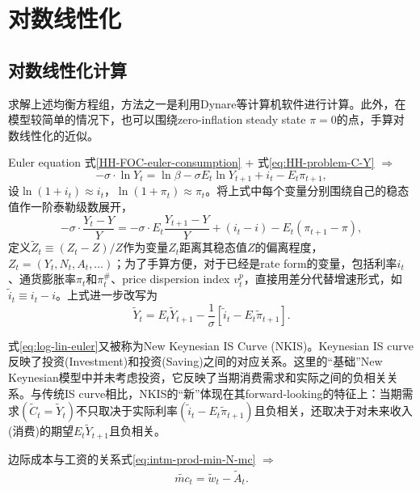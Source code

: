 \section{对数线性化}
\label{sec:BNK-log-lin-system}
\subsection{对数线性化计算}
\label{sec:BNK-log-linearization}
求解上述均衡方程组，方法之一是利用Dynare等计算机软件进行计算。此外，在模型较简单的情况下，也可以围绕zero-inflation steady state $\pi=0$的点，手算对数线性化的近似。

Euler equation 式\eqref{HH-FOC-euler-consumption} + 式\eqref{eq:HH-problem-C-Y} $\Rightarrow$
\begin{equation*}
  -\sigma \cdot \ln Y_t = \ln \beta - \sigma E_t \ln Y_{t+1} + i_t - E_t \pi_{t+1},
\end{equation*}
设$\ln (1+i_t) \approx i_t$，$\ln (1+\pi_t) \approx \pi_t$。将上式中每个变量分别围绕自己的稳态值作一阶泰勒级数展开，
\begin{equation*}
  -\sigma \cdot \frac{Y_t - Y}{Y} = -\sigma \cdot E_t \frac{Y_{t+1} - Y}{Y} + (i_t - i) - E_t (\pi_{t+1} - \pi),
\end{equation*}
定义$\tilde{Z}_t \equiv (Z_t - Z)/Z$作为变量$Z_t$距离其稳态值$Z$的偏离程度，$Z_t=(Y_t,N_t,A_t,\ldots)$；为了手算方便，对于已经是rate form的变量，包括利率$i_t$、通货膨胀率$\pi_t$和$\pi^{\#}_t$、price dispersion index $v^p_{t}$，直接用差分代替增速形式，如$\tilde{i}_t \equiv i_t -i$。上式进一步改写为
\begin{equation}
  \label{eq:log-lin-euler}
  \tilde{Y}_t = E_t \tilde{Y}_{t+1} - \frac{1}{\sigma} \left[\tilde{i}_t - E_t \tilde{\pi}_{t+1}\right].
\end{equation}

式\eqref{eq:log-lin-euler}又被称为New Keynesian IS Curve (NKIS)。Keynesian IS curve反映了投资(Investment)和投资(Saving)之间的对应关系。这里的“基础”New Keynesian模型中并未考虑投资，它反映了当期消费需求和实际之间的负相关关系。与传统IS curve相比，NKIS的“新”体现在其forward-looking的特征上：当期需求$(\tilde{C}_t = \tilde{Y}_t)$不只取决于实际利率$(\tilde{i}_t - E_t \tilde{\pi}_{t+1})$且负相关，还取决于对未来收入(消费)的期望$E_{t} \tilde {Y}_{t+1}$且负相关。

边际成本与工资的关系式\eqref{eq:intm-prod-min-N-mc} $\Rightarrow$
\begin{align}
  \tilde{mc}_t = \tilde{w}_t - \tilde{A}_t.
\end{align}

